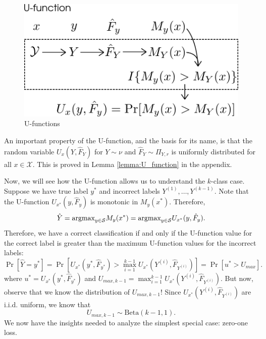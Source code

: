 \documentclass[12pt]{article}
\begin{document}
\begin{figure}[h]
\centering
\includegraphics[scale = 0.4]{extrapolation_figures/U_function.png}
\caption{U-functions}\label{fig:U_function}
\end{figure}

An important property of the U-function, and the basis for its name,
is that the random variable $U_x(Y, \hat{F}_Y)$ for $Y \sim \nu$ and
$\hat{F}_Y \sim \Pi_{Y, r}$ is uniformly distributed for all
$x \in \mathcal{X}$.  This is proved in Lemma \ref{lemma:U_function}
in the appendix.

Now, we will see how the U-function allows us to understand the
$k$-class case.  Suppose we have true label $y^*$ and incorrect labels
$Y^{(1)},\hdots, Y^{(k-1)}$.  Note that the U-function
$U_{x^*}(y, \hat{F}_y)$ is monotonic in $M_y(x^*)$.  Therefore,
\[
\hat{Y} = \text{argmax}_{y \in \mathcal{S}} M_y(x^*) = \text{argmax}_{y \in \mathcal{S}} U_{x^*}(y, \hat{F}_y).
\]
Therefore, we have a correct classification if and only if the U-function value for the correct label
is greater than the maximum U-function values for the incorrect labels:
\[
\Pr[\hat{Y} = y^*] = \Pr[U_{x^*}(y^*, \hat{F}_{y^*}) > \max_{i=1}^{k-1} U_{x^*}(Y^{(i)}, \hat{F}_{Y^{(i)}})] =  \Pr[u^* > U_{max}].
\]
where $u^* = U_{x^*}(y^*, \hat{F}_{y^*})$ and $U_{max, k-1}
= \max_{i=1}^{k-1} U_{x^*}(Y^{(i)}, \hat{F}_{Y^{(i)}})$.  But now,
observe that we know the distribution of $U_{max, k-1}$!  Since
$U_{x^*}(Y^{(i)}, \hat{F}_{Y^{(i)}})$ are i.i.d. uniform, we know that
\begin{equation}\label{eq:umax_beta}
U_{max, k-1} \sim \text{Beta}(k-1, 1). 
\end{equation}
We now have the insights needed to analyze the simplest special case: zero-one loss.
\newline
\end{document}
